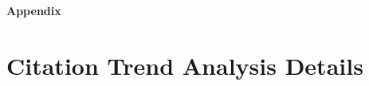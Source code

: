 
\begin{center}
\textbf{\LARGE Appendix}
\end{center}

\vspace{-2mm}\section{Citation Trend Analysis Details}\vspace{-1mm}
\label{append:citation}

